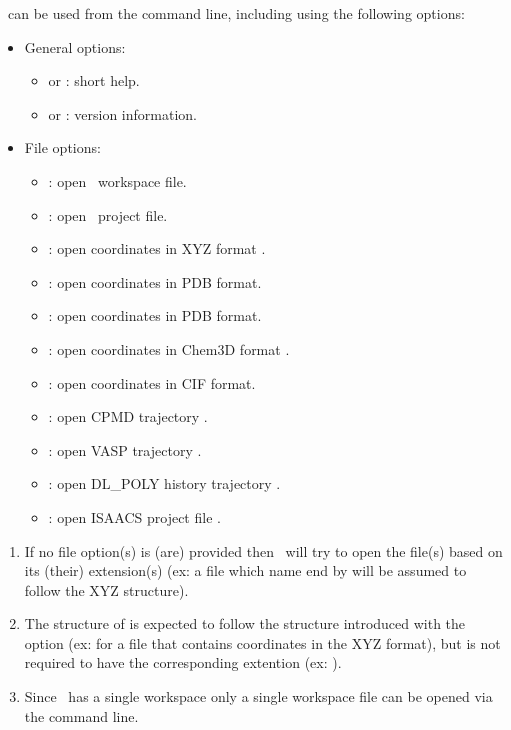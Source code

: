 \atomes\ can be used from the command line, including using the following options: 
\begin{itemize}
\item General options:
\begin{itemize}
\item[]  or : short help.
\item[]  or : version information.
\end{itemize}
\item File options:
\begin{itemize}
\item[] : open \atomes\ workspace file. 
\item[] : open \atomes\ project file.  
\item[] : open coordinates in XYZ format \cite{XYZ}. 
\item[] : open coordinates in PDB format. 
\item[] : open coordinates in PDB format. 
\item[] : open coordinates in Chem3D format \cite{Chem3D}. 
\item[] : open coordinates in CIF format. 
\item[] : open CPMD trajectory \cite{CPMD}. 
\item[] : open VASP trajectory \cite{VASP}. 
\item[] : open DL\_POLY history trajectory \cite{DLPOLY}. 
\item[] : open ISAACS project file \cite{ISAACS}. 
\end{itemize} 
\end{itemize}
\begin{enumerate}
\item If no file option(s) is (are) provided then \atomes\ will try to open the file(s) based on its (their) extension(s) 
(ex: a file which name end by  will be assumed to follow the XYZ structure). 
\item The structure of  is expected to follow the structure introduced with the option (ex:  for a file that contains 
coordinates in the XYZ format), but  is not required to have the corresponding extention (ex: ). 
\item Since \atomes\ has a single workspace only a single workspace file can be opened via the command line.
\end{enumerate}
